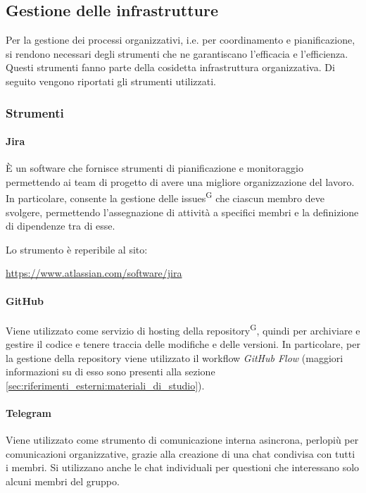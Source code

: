 \subsection{Gestione delle infrastrutture}\label{sec:processi_organizzativi:gestione_infrastrutture}
Per la gestione dei processi organizzativi, i.e. per coordinamento e pianificazione, si rendono necessari degli strumenti che ne garantiscano l'efficacia e l'efficienza. Questi strumenti fanno parte della cosidetta infrastruttura organizzativa.
Di seguito vengono riportati gli strumenti utilizzati.

\subsubsection{Strumenti}
\paragraph{Jira}
È un software che fornisce strumenti di pianificazione e monitoraggio permettendo ai team di progetto di avere una migliore organizzazione del lavoro. In particolare, consente la gestione delle issues\textsuperscript{G} che ciascun membro deve svolgere, permettendo l'assegnazione di attività a specifici membri e la definizione di dipendenze tra di esse.
\par Lo strumento è reperibile al sito:
\begin{center}
    \url{https://www.atlassian.com/software/jira}
\end{center}

\paragraph{GitHub}
Viene utilizzato come servizio di hosting della repository\textsuperscript{G}, quindi per archiviare e gestire il codice e tenere traccia delle modifiche e delle versioni. In particolare, per la gestione della repository viene utilizzato il workflow \textit{GitHub Flow} (maggiori informazioni su di esso sono presenti alla sezione \ref{sec:riferimenti_esterni:materiali_di_studio}).

\paragraph{Telegram}
Viene utilizzato come strumento di comunicazione interna asincrona, perlopiù per comunicazioni organizzative, grazie alla creazione di una chat condivisa con tutti i membri. Si utilizzano anche le chat individuali per questioni che interessano solo alcuni membri del gruppo.

